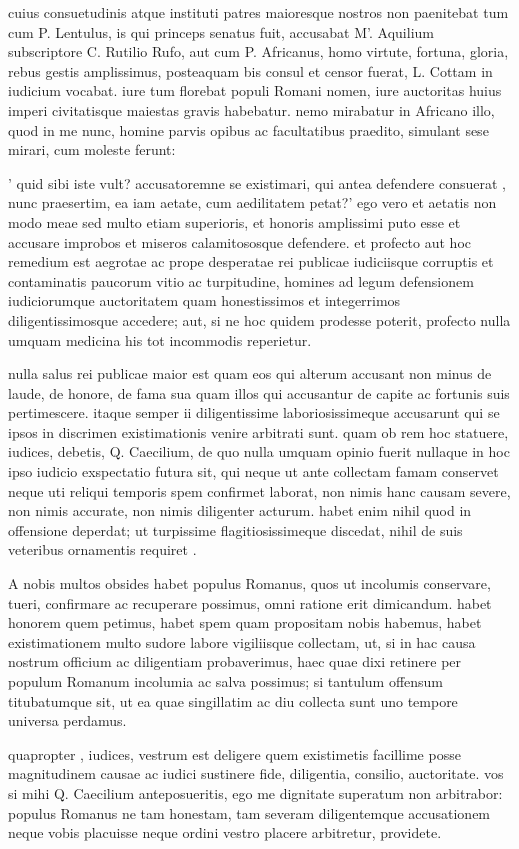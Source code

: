  cuius consuetudinis atque instituti patres maioresque nostros non paenitebat tum cum P. Lentulus, is qui princeps senatus fuit, accusabat M'. Aquilium subscriptore C. Rutilio Rufo, aut cum P. Africanus, homo virtute, fortuna, gloria, rebus gestis amplissimus, posteaquam bis consul et censor fuerat, L. Cottam in iudicium vocabat. iure tum florebat populi Romani nomen, iure auctoritas huius imperi civitatisque maiestas gravis habebatur. nemo mirabatur in Africano illo, quod in me nunc, homine parvis opibus ac facultatibus praedito, simulant sese mirari, cum moleste ferunt:

 ' quid sibi iste vult? accusatoremne se existimari, qui antea defendere consuerat , nunc praesertim, ea iam aetate, cum aedilitatem petat?' ego vero et aetatis non modo meae sed multo etiam superioris, et honoris amplissimi puto esse et accusare improbos et miseros calamitososque defendere. et profecto aut hoc remedium est aegrotae ac prope desperatae rei publicae iudiciisque corruptis et contaminatis paucorum vitio ac turpitudine, homines ad legum defensionem iudiciorumque auctoritatem quam honestissimos et integerrimos diligentissimosque accedere; aut, si ne hoc quidem prodesse poterit, profecto nulla umquam medicina his tot incommodis reperietur.

 nulla salus rei publicae maior est quam eos qui alterum accusant non minus de laude, de honore, de fama sua quam illos qui accusantur de capite ac fortunis suis pertimescere. itaque semper ii diligentissime laboriosissimeque accusarunt qui se ipsos in discrimen existimationis venire arbitrati sunt. quam ob rem hoc statuere, iudices, debetis, Q. Caecilium, de quo nulla umquam opinio fuerit nullaque in hoc ipso iudicio exspectatio futura sit, qui neque ut ante collectam famam conservet neque uti reliqui temporis spem confirmet laborat, non nimis hanc causam severe, non nimis accurate, non nimis diligenter acturum. habet enim nihil quod in offensione deperdat; ut turpissime flagitiosissimeque discedat, nihil de suis veteribus ornamentis requiret .

 A nobis multos obsides habet populus Romanus, quos ut incolumis conservare, tueri, confirmare ac recuperare possimus, omni ratione erit dimicandum. habet honorem quem petimus, habet spem quam propositam nobis habemus, habet existimationem multo sudore labore vigiliisque collectam, ut, si in hac causa nostrum officium ac diligentiam probaverimus, haec quae dixi retinere per populum Romanum incolumia ac salva possimus; si tantulum offensum titubatumque sit, ut ea quae singillatim ac diu collecta sunt uno tempore universa perdamus.

 quapropter , iudices, vestrum est deligere quem existimetis facillime posse magnitudinem causae ac iudici sustinere fide, diligentia, consilio, auctoritate. vos si mihi Q. Caecilium anteposueritis, ego me dignitate superatum non arbitrabor: populus Romanus ne tam honestam, tam severam diligentemque accusationem neque vobis placuisse neque ordini vestro placere arbitretur, providete.
